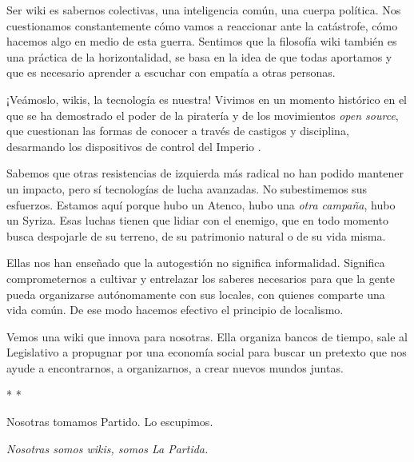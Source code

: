 Ser wiki es sabernos colectivas, una inteligencia común, una cuerpa
política. Nos cuestionamos constantemente cómo vamos a reaccionar ante
la catástrofe, cómo hacemos algo en medio de esta guerra. Sentimos que
la filosofía wiki también es una práctica de la horizontalidad, se basa
en la idea de que todas aportamos y que es necesario aprender a escuchar
con empatía a otras personas.

¡Veámoslo, wikis, la tecnología es nuestra! Vivimos en un momento
histórico en el que se ha demostrado el poder de la piratería y de los
movimientos \emph{open source}, que cuestionan las formas de conocer a
través de castigos y disciplina, desarmando los dispositivos de control
del Imperio \cite{Amin2005}.

Sabemos que otras resistencias de izquierda más radical no han podido
mantener un impacto, pero sí tecnologías de lucha avanzadas. No
subestimemos sus esfuerzos. Estamos aquí porque hubo un Atenco, hubo una
\emph{otra campaña}, hubo un Syriza. Esas luchas tienen que lidiar con
el enemigo, que en todo momento busca despojarle de su terreno, de su
patrimonio natural o de su vida misma.

Ellas nos han enseñado que la autogestión no significa informalidad.
Significa comprometernos a cultivar y entrelazar los saberes necesarios
para que la gente pueda organizarse autónomamente con sus locales, con
quienes comparte una vida común. De ese modo hacemos efectivo el
principio de localismo.

Vemos una wiki que innova para nosotras. Ella organiza bancos de tiempo,
sale al Legislativo a propugnar por una economía social para buscar un
pretexto que nos ayude a encontrarnos, a organizarnos, a crear nuevos
mundos juntas.

\begin{center}
    * *
\end{center}

Nosotras tomamos Partido. Lo escupimos.

\emph{Nosotras somos wikis, somos La Partida.}
